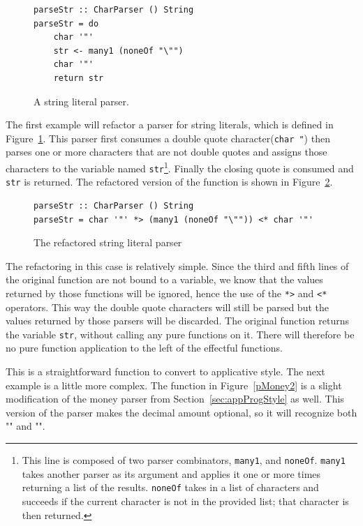 \begin{figure}[t]
\begin{lstlisting}
parseStr :: CharParser () String
parseStr = do
	char '"'
	str <- many1 (noneOf "\"")
	char '"'
	return str
\end{lstlisting}
\caption{A string literal parser.}
\label{strLit}
\end{figure}

The first example will refactor a parser for string literals, which is defined in Figure~\ref{strLit}. This parser first consumes a double quote character(\texttt{char \textquotesingle"\textquotesingle}) then parses one or more characters that are not double quotes and assigns those characters to the variable named \texttt{str}\footnote{This line is composed of two parser combinators, \texttt{many1}, and \texttt{noneOf}. \texttt{many1} takes another parser as its argument and applies it one or more times returning a list of the results. \texttt{noneOf} takes in a list of characters and succeeds if the current character is not in the provided list; that character is then returned.}. Finally the closing quote is consumed and \texttt{str} is returned. The refactored version of the function is shown in Figure~\ref{strLit_ref}.

\begin{figure}[t]
\begin{lstlisting}
parseStr :: CharParser () String
parseStr = char '"' *> (many1 (noneOf "\"")) <* char '"'
\end{lstlisting}
\caption{The refactored string literal parser}
\label{strLit_ref}
\end{figure}

The refactoring in this case is relatively simple. Since the third and fifth lines of the original function are not bound to a variable, we know that the values returned by those functions will be ignored, hence the use of the \texttt{*>} and \texttt{<*} operators. This way the double quote characters will still be parsed but the values returned by those parsers will be discarded. The original 
function returns the variable \texttt{str}, without calling any pure functions on it. There will therefore be no pure function application to the left of the effectful functions. 

This is a straightforward function to convert to applicative style. The next example is a little more complex. The function in Figure~\ref{pMoney2} is a slight modification of the money parser from Section~\ref{sec:appProgStyle} as well. This version of the parser makes the decimal amount optional, so it will recognize both "" and "".

